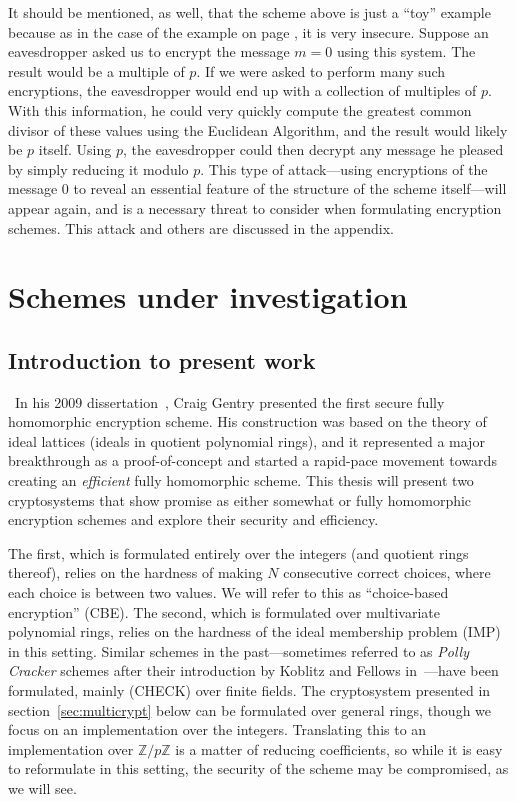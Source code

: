 \documentclass[11pt]{report}
\newcommand{\Z}{\mathbb{Z}}
\begin{document}
It should be mentioned, as well, that the scheme above is just a ``toy'' example because as in the case of the example on page \pageref{Example1}, it is very insecure. Suppose an eavesdropper asked us to encrypt the message $m=0$ using this system. The result would be a multiple of $p$. If we were asked to perform many such encryptions, the eavesdropper would end up with a collection of multiples of $p$. With this information, he could very quickly compute the greatest common divisor of these values using the Euclidean Algorithm, and the result would likely be $p$ itself. Using $p$, the eavesdropper could then decrypt any message he pleased by simply reducing it modulo $p$. This type of attack---using encryptions of the message $0$ to reveal an essential feature of the structure of the scheme itself---will appear again, and is a necessary threat to consider when formulating encryption schemes. This attack and others are discussed in the appendix.

\chapter{Schemes under investigation}

\section{Introduction to present work}

\
In his 2009 dissertation~\cite{gentry-thesis}, Craig Gentry presented the first secure fully homomorphic encryption scheme. His construction was based on the theory of ideal lattices (ideals in quotient polynomial rings), and it represented a major breakthrough as a proof-of-concept and started a rapid-pace movement towards creating an \emph{efficient} fully homomorphic scheme. This thesis will present two cryptosystems that show promise as either somewhat or fully homomorphic encryption schemes and explore their security and efficiency.

The first, which is formulated entirely over the integers (and quotient rings thereof), relies on the hardness of making $N$ consecutive correct choices, where each choice is between two values. We will refer to this as ``choice-based encryption'' (CBE). The second, which is formulated over multivariate polynomial rings, relies on the hardness of the ideal membership problem (IMP) in this setting. Similar schemes in the past---sometimes referred to as \emph{Polly Cracker} schemes after their introduction by Koblitz and Fellows in~\cite{fellows-koblitz}---have been formulated, mainly (CHECK) over finite fields. The cryptosystem presented in section~\ref{sec:multicrypt}  below can be formulated over general rings, though we focus on an implementation over the integers. Translating this to an implementation over $\Z/p\Z$ is a matter of reducing coefficients, so while it is easy to reformulate in this setting, the security of the scheme may be compromised, as we will see.
\end{document}
